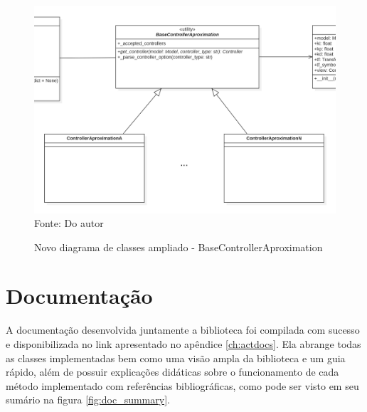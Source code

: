 \begin{figure}[H]
    \centering
    \caption{Novo diagrama de classes ampliado - BaseControllerAproximation}
    \includegraphics[scale=0.40]{figuras/class_diag_bcacontroller_new}
    \label{fig:class_diag_bcacontroller_new}
    \\
    \vspace{0cm}\hspace{0cm}\small{Fonte: Do autor}
\end{figure}


\section{Documentação}

A documentação desenvolvida juntamente a biblioteca foi compilada com sucesso e disponibilizada no link apresentado
no apêndice \ref{ch:actdocs}.
Ela abrange todas as classes implementadas bem como uma visão ampla da biblioteca e um guia rápido, além de possuir
explicações didáticas sobre o funcionamento de cada método implementado com referências bibliográficas, como pode ser
visto em seu sumário na figura \ref{fig:doc_summary}.

